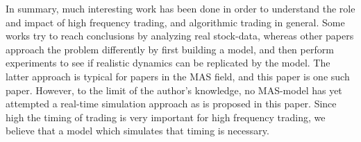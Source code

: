 \documentclass{article}
\begin{document}
In summary, much interesting work has been done in order to understand the role and impact of high frequency trading, and algorithmic trading in general. Some works try to reach conclusions by analyzing real stock-data, whereas other papers approach the problem differently by first building a model, and then perform experiments to see if realistic dynamics can be replicated by the model. The latter approach is typical for papers in the MAS field, and this paper is one such paper. However, to the limit of the author's knowledge, no MAS-model has yet attempted a real-time simulation approach as is proposed in this paper. Since high the timing of trading is very important for high frequency trading, we believe that a model which simulates that timing is necessary.



\end{document}
